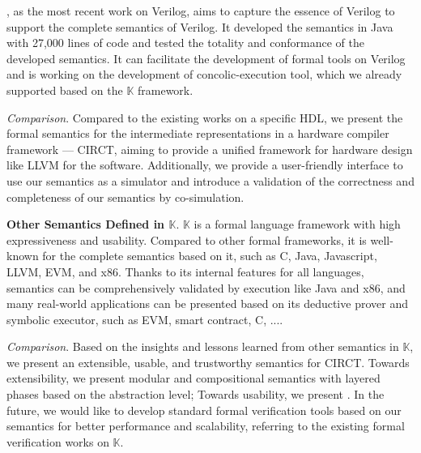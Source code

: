 \citet{chenEssenceVerilogTractable2023}, as the most recent work on Verilog, aims to capture the essence of Verilog to support the complete semantics of Verilog. It developed the semantics in Java with 27,000 lines of code and tested the totality and conformance of the developed semantics. It can facilitate the development of formal tools on Verilog and is working on the development of concolic-execution tool, which we already supported based on the $\mathbb{K}$ framework.

\smallskip
\textit{Comparison}. Compared to the existing works on a specific HDL, we present the formal semantics for the intermediate representations in a hardware compiler framework --- CIRCT, aiming to provide a unified framework for hardware design like LLVM for the software. Additionally, we provide a user-friendly interface to use our semantics as a simulator and introduce a validation of the correctness and completeness of our semantics by co-simulation.

\smallskip
\textbf{Other Semantics Defined in $\mathbb{K}$}. $\mathbb{K}$ is a formal language framework with high expressiveness and usability. Compared to other formal frameworks, it is well-known for the complete semantics based on it, such as C, Java, Javascript, LLVM, EVM, and x86. Thanks to its internal features for all languages, semantics can be comprehensively validated by execution like Java and x86, and many real-world applications can be presented based on its deductive prover and symbolic executor, such as EVM, smart contract, C, ....

\smallskip
\textit{Comparison}. Based on the insights and lessons learned from other semantics in $\mathbb{K}$, we present an extensible, usable, and trustworthy semantics for CIRCT. Towards extensibility, we present modular and compositional semantics with layered phases based on the abstraction level; Towards usability, we present . In the future, we would like to develop standard formal verification tools based on our semantics for better performance and scalability, referring to the existing formal verification works on $\mathbb{K}$.
